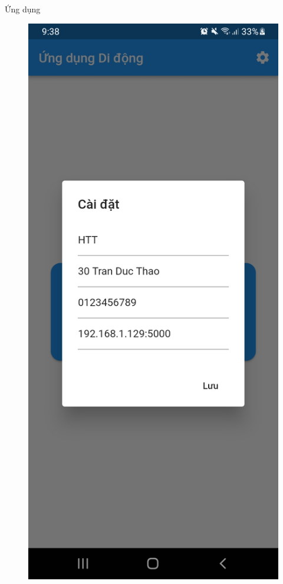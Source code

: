 \documentclass{beamer}
\begin{document}
\begin{frame}[allowframebreaks]{Ứng dụng}
\begin{figure}[H]
		\includegraphics[scale=0.1]{images/screenshot2.jpg}

\end{figure}
\end{frame}
\end{document}
